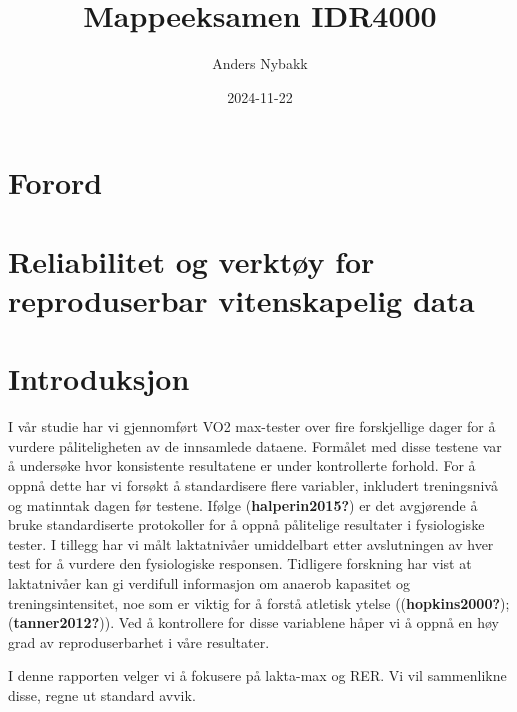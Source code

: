\documentclass[
  letterpaper,
  DIV=11,
  numbers=noendperiod]{scrreprt}
\title{Mappeeksamen IDR4000}
\author{Anders Nybakk}
\date{2024-11-22}
\renewcommand*\contentsname{Table of contents}
\newcommand\contentsname{Table of contents}
\begin{document}
\maketitle

\renewcommand*\contentsname{Table of contents}
{
\hypersetup{linkcolor=}
\setcounter{tocdepth}{2}
\tableofcontents
}


\chapter*{Forord}\label{forord}



\chapter{Reliabilitet og verktøy for reproduserbar vitenskapelig
data}\label{reliabilitet-og-verktuxf8y-for-reproduserbar-vitenskapelig-data}


\chapter{Introduksjon}\label{introduksjon}

I vår studie har vi gjennomført VO2 max-tester over fire forskjellige
dager for å vurdere påliteligheten av de innsamlede dataene. Formålet
med disse testene var å undersøke hvor konsistente resultatene er under
kontrollerte forhold. For å oppnå dette har vi forsøkt å standardisere
flere variabler, inkludert treningsnivå og matinntak dagen før testene.
Ifølge (\textbf{halperin2015?}) er det avgjørende å bruke standardiserte
protokoller for å oppnå pålitelige resultater i fysiologiske tester. I
tillegg har vi målt laktatnivåer umiddelbart etter avslutningen av hver
test for å vurdere den fysiologiske responsen. Tidligere forskning har
vist at laktatnivåer kan gi verdifull informasjon om anaerob kapasitet
og treningsintensitet, noe som er viktig for å forstå atletisk ytelse
((\textbf{hopkins2000?}); (\textbf{tanner2012?})). Ved å kontrollere for
disse variablene håper vi å oppnå en høy grad av reproduserbarhet i våre
resultater.

I denne rapporten velger vi å fokusere på lakta-max og RER. Vi vil
sammenlikne disse, regne ut standard avvik.
\end{document}
